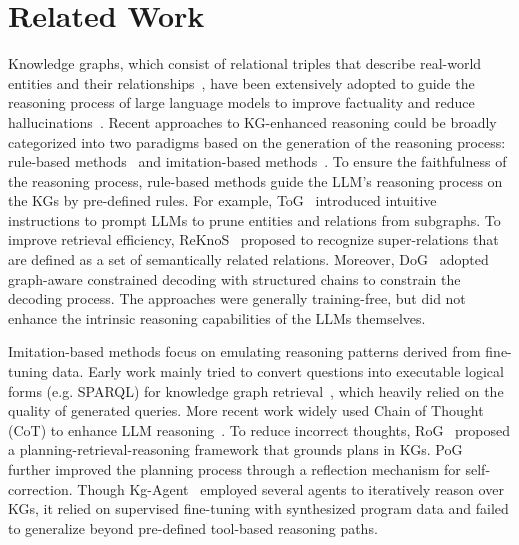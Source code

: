 \section{Related Work}

Knowledge graphs, which consist of relational triples that describe real-world entities and their relationships~\citep{kg_acm,chen-etal-2022-learning,zhang2022relu}, 
have been extensively adopted to guide the reasoning process of large language models to improve factuality and reduce hallucinations~\citep{agrawal2024can}.
Recent approaches to KG-enhanced reasoning could be broadly categorized into two paradigms based on the generation of the reasoning process: rule-based methods~\citep{sun2023thinkongraph,zhang-etal-2025-rule,li-etal-2025-decoding-graphs} and imitation-based methods~\citep{wu2024cotkr,mavromatis2025gnn,jiang-etal-2025-kg}.
To ensure the faithfulness of the reasoning process, rule-based methods guide the LLM's reasoning process on the KGs by pre-defined rules.
For example, ToG~\citep{sun2023thinkongraph} introduced intuitive instructions to prompt LLMs to prune entities and relations from subgraphs. 
To improve retrieval efficiency, ReKnoS~\citep{wang2025reasoning} proposed to recognize super-relations that are defined as a set of semantically related relations.
Moreover, DoG~\citep{li-etal-2025-decoding-graphs} adopted graph-aware constrained decoding with structured chains to constrain the decoding process. 
The approaches were generally training-free, but did not enhance the intrinsic reasoning capabilities of the LLMs themselves.

Imitation-based methods focus on emulating reasoning patterns derived from fine-tuning data.
Early work mainly tried to convert questions into executable logical forms (e.g. SPARQL) for knowledge graph retrieval~\citep{lan2020query,das-etal-2021-case,ye-etal-2022-rng}, which heavily relied on the quality of generated queries.
More recent work widely used Chain of Thought (CoT) to enhance LLM reasoning~\citep{wu2024cotkr,zhao2024kg}.
To reduce incorrect thoughts, RoG~\citep{luo2024rog} proposed a planning-retrieval-reasoning framework that grounds plans in KGs. 
PoG~\citep{chen2024plan} further improved the planning process through a reflection mechanism for self-correction.
Though Kg-Agent~\citep{jiang-etal-2025-kg} employed several agents to iteratively reason over KGs, it relied on supervised fine-tuning with synthesized program data and failed to generalize beyond pre-defined tool-based reasoning paths.

